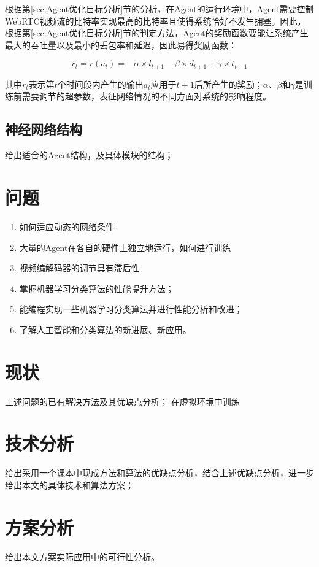 \documentclass[a4paper]{ctexart}
\begin{document}
根据第\ref{sec:Agent优化目标分析}节的分析，在Agent的运行环境中，Agent需要控制WebRTC视频流的比特率实现最高的比特率且使得系统恰好不发生拥塞。因此，根据第\ref{sec:Agent优化目标分析}节的判定方法，Agent的奖励函数要能让系统产生最大的吞吐量以及最小的丢包率和延迟，因此易得奖励函数：

$$r_t=r(a_t)=-\alpha\times l_{t+1}-\beta\times d_{t+1}+\gamma\times t_{t+1}$$

其中$r_t$表示第$t$个时间段内产生的输出$a_t$应用于$t+1$后所产生的奖励；$\alpha$、$\beta$和$\gamma$是训练前需要调节的超参数，表征网络情况的不同方面对系统的影响程度。

\subsection{神经网络结构}

给出适合的Agent结构，及具体模块的结构；
\section{问题}
\begin{enumerate}[label=\arabic*、]
	\item 如何适应动态的网络条件
	\item 大量的Agent在各自的硬件上独立地运行，如何进行训练
	\item 视频编解码器的调节具有滞后性
	\item 掌握机器学习分类算法的性能提升方法；
	\item 能编程实现一些机器学习分类算法并进行性能分析和改进；
	\item 了解人工智能和分类算法的新进展、新应用。
\end{enumerate}
\section{现状}
上述问题的已有解决方法及其优缺点分析；
在虚拟环境中训练
\section{技术分析}
给出采用一个课本中现成方法和算法的优缺点分析，结合上述优缺点分析，进一步给出本文的具体技术和算法方案；
\section{方案分析}
给出本文方案实际应用中的可行性分析。
\end{document}
